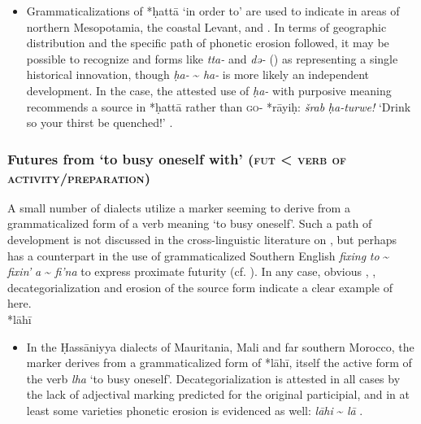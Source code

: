 \documentclass[output=paper]{langsci/langscibook}
\begin{document}
\begin{itemize}

  \item[]
Grammaticalizations of *ḥattā ‘in order to’ are used to indicate   in areas of northern Mesopotamia, the coastal Levant, and . In terms of geographic distribution and the specific path of phonetic erosion followed, it may be possible to recognize  and  forms like  \textit{tta-} and  \textit{də-} (\citealt{Jastrow1979,Borg1985}) as representing a single historical innovation, though  \textit{ḥa-} {\textasciitilde} \textit{ha-} is more likely an independent development. In the  case, the attested use of \textit{ḥa-} with purposive meaning recommends a source in *ḥattā rather than \textsc{go}{}- *rāyiḥ: \textit{šrab} \textit{ḥa-turwe!} ‘Drink so your thirst be quenched!’ \citep[276]{Reinhardt1894}.
\end{itemize}

\subsubsection{ Futures from ‘to busy oneself with’ (\textsc{fut} < \textsc{verb} \textsc{of} \textsc{activity/preparation})}

A small number of  dialects utilize a   marker seeming to derive from a grammaticalized form of a verb meaning ‘to busy oneself’. Such a path of development is not discussed in the cross-linguistic literature on , but perhaps has a counterpart in the use of grammaticalized {Southern}  {English} \textit{fixing} \textit{to} {\textasciitilde} \textit{fixin’} \textit{a} {\textasciitilde} \textit{fi’na} to express proximate futurity (cf. \citealt{Wolfram1998}). In any case, obvious , , decategorialization and erosion of the source form indicate a clear example of  here.\\
 
*lāhī

\begin{itemize}

  \item[]
In the Ḥassāniyya dialects of Mauritania, Mali and far southern Morocco, the   marker derives from a grammaticalized form of *lāhī, itself the active  form of the verb \textit{lha} ‘to busy oneself’. Decategorialization is attested in all cases by the lack of adjectival  marking predicted for the original participial, and in at least some varieties phonetic erosion is evidenced as well:  \textit{lāhi} {\textasciitilde} \textit{lā} \citep{Heath2003}.
\end{itemize}
\end{document}
